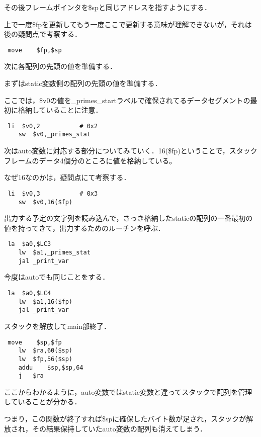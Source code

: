 \documentclass[a4j]{jarticle}
\begin{document}
その後フレームポインタを\$spと同じアドレスを指すようにする．

上で一度\$fpを更新してもう一度ここで更新する意味が理解できないが，それは後の疑問点で考察する．

\begin{verbatim}
 move    $fp,$sp
\end{verbatim}

次に各配列の先頭の値を準備する．

まずはstatic変数側の配列の先頭の値を準備する．

ここでは，\$v0の値を\_primes\_startラベルで確保されてるデータセグメントの最初に格納していることに注意．


\begin{verbatim}
 li  $v0,2           # 0x2
    sw  $v0,_primes_stat
\end{verbatim}

次はauto変数に対応する部分についてみていく．16(\$fp)ということで，スタックフレームのデータ4個分のところに値を格納している。

なぜ16なのかは，疑問点にて考察する．

\begin{verbatim}
 li  $v0,3           # 0x3
    sw  $v0,16($fp)
\end{verbatim}

出力する予定の文字列を読み込んで，さっき格納したstaticの配列の一番最初の値を持ってきて，出力するためのルーチンを呼ぶ．

\begin{verbatim}
 la  $a0,$LC3
    lw  $a1,_primes_stat
    jal _print_var
\end{verbatim}

今度はautoでも同じことをする．

\begin{verbatim}
 la  $a0,$LC4
    lw  $a1,16($fp)
    jal _print_var
\end{verbatim}

スタックを解放してmain部終了．

\begin{verbatim}
 move    $sp,$fp
    lw  $ra,60($sp)
    lw  $fp,56($sp)
    addu    $sp,$sp,64
    j   $ra
\end{verbatim}

ここからわかるように，auto変数ではstatic変数と違ってスタックで配列を管理していることが分かる．

つまり，この関数が終了すれば\$spに確保したバイト数が足され，スタックが解放され，その結果保持していたauto変数の配列も消えてしまう．
\end{document}
